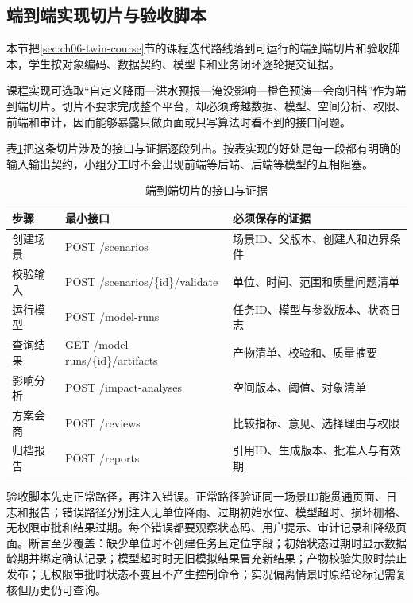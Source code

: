 \subsection{端到端实现切片与验收脚本}\label{sec:ch08-twin-course}

本节把\ref{sec:ch06-twin-course}节的课程迭代路线落到可运行的端到端切片和验收脚本，学生按对象编码、数据契约、模型卡和业务闭环逐轮提交证据。

课程实现可选取“自定义降雨—洪水预报—淹没影响—橙色预演—会商归档”作为端到端切片。切片不要求完成整个平台，却必须跨越数据、模型、空间分析、权限、前端和审计，因而能够暴露只做页面或只写算法时看不到的接口问题。

表\ref{tab:end-to-end-slice}把这条切片涉及的接口与证据逐段列出。按表实现的好处是每一段都有明确的输入输出契约，小组分工时不会出现前端等后端、后端等模型的互相阻塞。

\begin{table}[htbp]
\centering
\caption{端到端切片的接口与证据}
\label{tab:end-to-end-slice}
\begin{tabular}{p{2.2cm}p{4.7cm}p{5.6cm}}
\toprule
步骤 & 最小接口 & 必须保存的证据 \\
\midrule
创建场景 & POST /scenarios & 场景ID、父版本、创建人和边界条件 \\
校验输入 & POST /scenarios/\{id\}/validate & 单位、时间、范围和质量问题清单 \\
运行模型 & POST /model-runs & 任务ID、模型与参数版本、状态日志 \\
查询结果 & GET /model-runs/\{id\}/artifacts & 产物清单、校验和、质量摘要 \\
影响分析 & POST /impact-analyses & 空间版本、阈值、对象清单 \\
方案会商 & POST /reviews & 比较指标、意见、选择理由与权限 \\
归档报告 & POST /reports & 引用ID、生成版本、批准人与有效期 \\
\bottomrule
\end{tabular}
\end{table}

验收脚本先走正常路径，再注入错误。正常路径验证同一场景ID能贯通页面、日志和报告；错误路径分别注入无单位降雨、过期初始水位、模型超时、损坏栅格、无权限审批和结果过期。每个错误都要观察状态码、用户提示、审计记录和降级页面。断言至少覆盖：缺少单位时不创建任务且定位字段；初始状态过期时显示数据龄期并绑定确认记录；模型超时时无旧模拟结果冒充新结果；产物校验失败时禁止发布；无权限审批时状态不变且不产生控制命令；实况偏离情景时原结论标记需复核但历史仍可查询。


